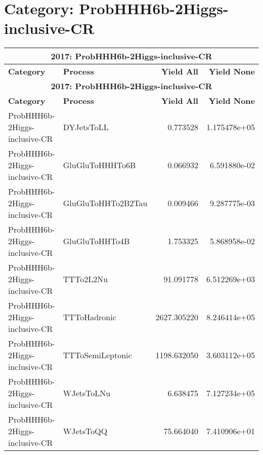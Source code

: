 \documentclass{article}
\begin{document}
\section*{Category: ProbHHH6b-2Higgs-inclusive-CR}
\begin{longtable}[c]{|l|l|r|r|}
\hline
\multicolumn{4}{|c|}{\textbf{2017: ProbHHH6b-2Higgs-inclusive-CR}} \\
\hline
\textbf{Category} & \textbf{Process} & \textbf{Yield All} & \textbf{Yield None} \\
\hline
\endfirsthead
\hline
\multicolumn{4}{|c|}{\textbf{2017: ProbHHH6b-2Higgs-inclusive-CR}} \\
\hline
\textbf{Category} & \textbf{Process} & \textbf{Yield All} & \textbf{Yield None} \\
\hline
\endhead
ProbHHH6b-2Higgs-inclusive-CR & DYJetsToLL & 0.773528 & 1.175478e+05 \\
\hline
ProbHHH6b-2Higgs-inclusive-CR & GluGluToHHHTo6B & 0.066932 & 6.591880e-02 \\
\hline
ProbHHH6b-2Higgs-inclusive-CR & GluGluToHHTo2B2Tau & 0.009466 & 9.287775e-03 \\
\hline
ProbHHH6b-2Higgs-inclusive-CR & GluGluToHHTo4B & 1.753325 & 5.868958e-02 \\
\hline
ProbHHH6b-2Higgs-inclusive-CR & TTTo2L2Nu & 91.091778 & 6.512269e+03 \\
\hline
ProbHHH6b-2Higgs-inclusive-CR & TTToHadronic & 2627.305220 & 8.246414e+05 \\
\hline
ProbHHH6b-2Higgs-inclusive-CR & TTToSemiLeptonic & 1198.632050 & 3.603112e+05 \\
\hline
ProbHHH6b-2Higgs-inclusive-CR & WJetsToLNu & 6.638475 & 7.127234e+05 \\
\hline
ProbHHH6b-2Higgs-inclusive-CR & WJetsToQQ & 75.664040 & 7.410906e+01 \\
\hline
\end{longtable}
\end{document}

